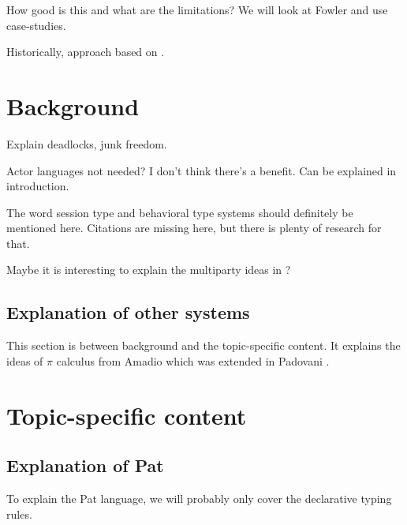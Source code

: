 How good is this and what are the limitations? We will look at Fowler \cite{fowlerSpecialDeliveryProgramming2023} and use case-studies.

Historically, approach based on \cite{deliguoroMailboxTypesUnordered2018}.

\section{Background}
\label{sec:background}


Explain deadlocks, junk freedom.

Actor languages not needed? I don't think there's a benefit. Can be explained in introduction.

The word session type and behavioral type systems should definitely be mentioned here. Citations are missing here, but there is plenty of research for that. 

Maybe it is interesting to explain the multiparty ideas in \cite{neykovaMultipartySessionActors2017}?

\subsection{Explanation of other systems}
This section is between background and the topic-specific content. It explains the ideas of $\pi$ calculus from Amadio \cite{amadioBisimulationsAsynchronousPcalculus1998a} which was extended in Padovani \cite{padovaniTypeCheckingAlgorithm2018}.



\section{Topic-specific content}
\label{sec:contentSummary}



\subsection{Explanation of Pat}
To explain the Pat language, we will probably only cover the declarative typing rules.


